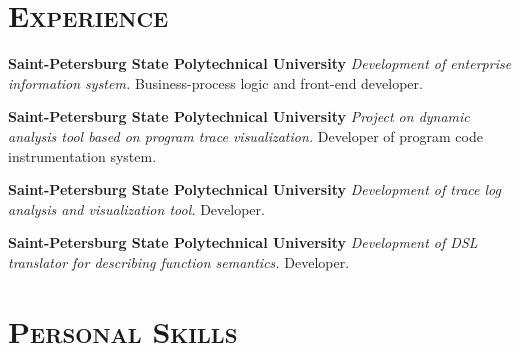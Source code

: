 \documentclass[12pt,a4paper]{moderncv}
\begin{document}
\section{\textsc{Experience}}
%
%

{\textbf{Saint-Petersburg State Polytechnical University}\newline
 \textit{Development of enterprise information system.}\newline
         Business-process logic and front-end developer.}

{\textbf{Saint-Petersburg State Polytechnical University}\newline
 \textit{Project on dynamic analysis tool based on program trace visualization.}
 \newline Developer of program code instrumentation system.}

{\textbf{Saint-Petersburg State Polytechnical University}\newline
 \textit{Development of trace log analysis and visualization tool.}
 \newline Developer.}

{\textbf{Saint-Petersburg State Polytechnical University}\newline
 \textit{Development of DSL translator for describing function semantics.}
 \newline Developer.}


\section{\textsc{Personal Skills}}
%
%
%
%
%

\end{document}
